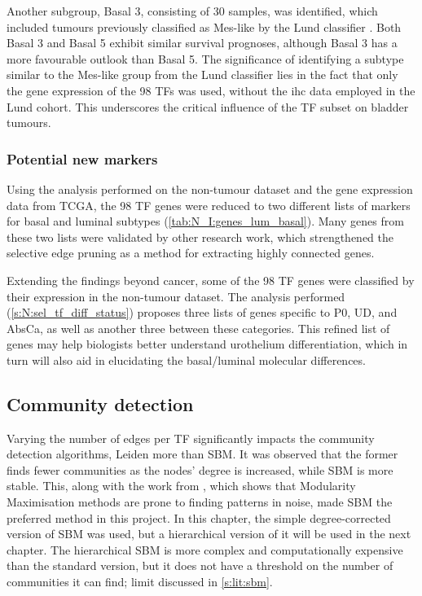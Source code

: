Another subgroup, Basal 3, consisting of 30 samples, was identified, which included tumours previously classified as Mes-like by the Lund classifier \citep{Marzouka2018-ge}. Both Basal 3 and Basal 5 exhibit similar survival prognoses, although Basal 3 has a more favourable outlook than Basal 5. The significance of identifying a subtype similar to the Mes-like group from the Lund classifier lies in the fact that only the gene expression of the 98 TFs was used, without the \acrlong{ihc} data employed in the Lund cohort. This underscores the critical influence of the TF subset on bladder tumours.



\subsubsection*{Potential new markers}

Using the analysis performed on the non-tumour dataset and the gene expression data from TCGA, the 98 TF genes were reduced to two different lists of markers for basal and luminal subtypes (\cref{tab:N_I:genes_lum_basal}). Many genes from these two lists were validated by other research work, which strengthened the selective edge pruning as a method for extracting highly connected genes.

Extending the findings beyond cancer, some of the 98 TF genes were classified by their expression in the non-tumour dataset. The analysis performed (\cref{s:N:sel_tf_diff_status}) proposes three lists of genes specific to P0, UD, and AbsCa, as well as another three between these categories. This refined list of genes may help biologists better understand urothelium differentiation, which in turn will also aid in elucidating the basal/luminal molecular differences.


\subsection*{Community detection}

Varying the number of edges per TF significantly impacts the community detection algorithms, Leiden more than SBM. It was observed that the former finds fewer communities as the nodes' degree is increased, while SBM is more stable. This, along with the work from \citet{Peixoto2021-jx, Peixoto2023-rt}, which shows that Modularity Maximisation methods are prone to finding patterns in noise, made SBM the preferred method in this project. In this chapter, the simple degree-corrected version of SBM was used, but a hierarchical version of it will be used in the next chapter. The hierarchical SBM is more complex and computationally expensive than the standard version, but it does not have a threshold on the number of communities it can find; limit discussed in \cref{s:lit:sbm}.


